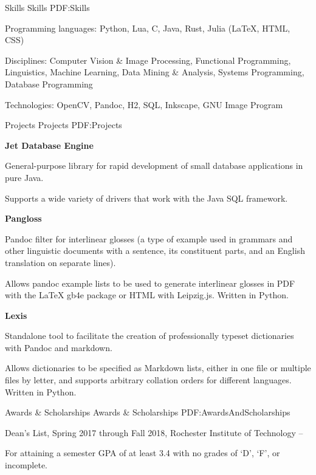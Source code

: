 \documentclass[letterpaper,MMMyyyy,nonstopmode]{simpleresumecv}
\begin{document}
\begin{Body}

\Section
{Skills}
{Skills}
{PDF:Skills}

\BulletItem
Programming languages:
Python,
Lua,
C,
Java,
Rust,
Julia
(\LaTeX, HTML, CSS)

\BulletItem
Disciplines:
Computer Vision \& Image Processing,
Functional Programming, %
Linguistics,
Machine Learning,
Data Mining \& Analysis,
Systems Programming,
Database Programming

\BulletItem
Technologies:
OpenCV,
Pandoc,
H2,
SQL,
Inkscape,
GNU Image Program


\Section
{Projects}
{Projects}
{PDF:Projects}

\Entry
\textbf{Jet Database Engine}

\BulletItem
General-purpose library for rapid development of small database applications
in pure Java.

\Gap
\BulletItem
Supports a wide variety of drivers that work with the Java SQL framework.

\BigGap
\Entry
\textbf{Pangloss}

\BulletItem
Pandoc filter for interlinear glosses (a type of example used in grammars and
other linguistic documents with a sentence, its constituent parts, and an
English translation on separate lines).

\Gap
\BulletItem
Allows pandoc example lists to be used to generate interlinear glosses in PDF
with the \LaTeX{} gb4e package or HTML with Leipzig.js. Written in Python.

\BigGap
\Entry
\textbf{Lexis}

\BulletItem
Standalone tool to facilitate the creation of professionally typeset
dictionaries with Pandoc and markdown.

\Gap
\BulletItem
Allows dictionaries to be specified as Markdown lists, either in one file or
multiple files by letter, and supports arbitrary collation orders for different
languages. Written in Python.


\Section
{Awards \&\newline
Scholarships}
{Awards \& Scholarships}
{PDF:AwardsAndScholarships}

\BulletItem
Dean's List,
Spring 2017 through Fall 2018,
Rochester Institute of Technology
\hfill
{} --
\begin{Detail}
\Item
For attaining a semester GPA of at least 3.4 with no grades of `D', `F', or
incomplete.
\end{Detail}


\end{Body}
\end{document}
